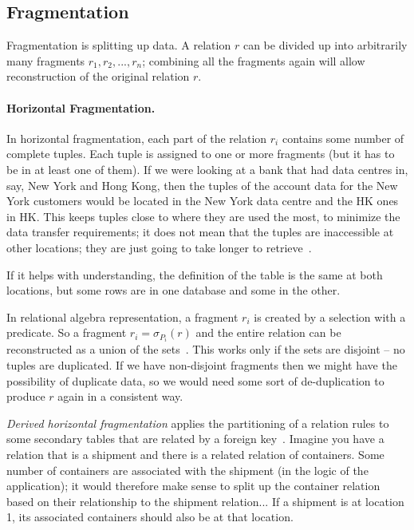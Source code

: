 \subsection*{Fragmentation}

Fragmentation is splitting up data. A relation $r$ can be divided up into arbitrarily many fragments $r_{1}, r_{2}, ..., r_{n}$; combining all the fragments again will allow reconstruction of the original relation $r$. 

\paragraph{Horizontal Fragmentation.} In horizontal fragmentation, each part of the relation $r_{i}$ contains some number of complete tuples. Each tuple is assigned to one or more fragments (but it has to be in at least one of them). If we were looking at a bank that had data centres in, say, New York and Hong Kong, then the tuples of the account data for the New York customers would be located in the New York data centre and the HK ones in HK. This keeps tuples close to where they are used the most, to minimize the data transfer requirements; it does not mean that the tuples are inaccessible at other locations; they are just going to take longer to retrieve~\cite{dsc}.

If it helps with understanding, the definition of the table is the same at both locations, but some rows are in one database and some in the other.

In relational algebra representation, a fragment $r_{i}$ is created by a selection with a predicate. So a fragment $r_{i} = \sigma_{P_{i}}(r)$ and the entire relation can be reconstructed as a union of the sets~\cite{dsc}. This works only if the sets are disjoint -- no tuples are duplicated. If we have non-disjoint fragments then we might have the possibility of duplicate data, so we would need some sort of de-duplication to produce $r$ again in a consistent way.

\textit{Derived horizontal fragmentation} applies the partitioning of a relation rules to some secondary tables that are related by a foreign key~\cite{fds}. Imagine you have a relation that is a shipment and there is a related relation of containers. Some number of containers are associated with the shipment (in the logic of the application); it would therefore make sense to split up the container relation based on their relationship to the shipment relation... If a shipment is at location 1, its associated containers should also be at that location.

